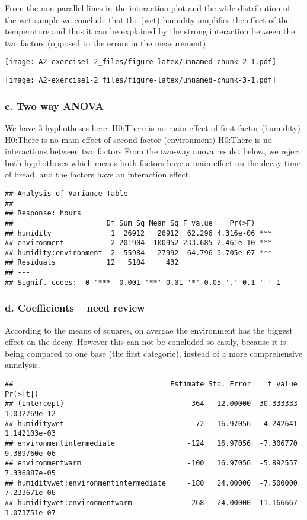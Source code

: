 \documentclass[]{article}
\begin{document}
From the non-parallel lines in the interaction plot and the wide
distribution of the wet sample we conclude that the (wet) humidity
amplifies the effect of the temperature and thus it can be explained by
the strong interaction between the two factors (opposed to the errors in
the measurement).

\texttt{[image: A2-exercise1-2\_files/figure-latex/unnamed-chunk-2-1.pdf]}

\texttt{[image: A2-exercise1-2\_files/figure-latex/unnamed-chunk-3-1.pdf]}

\hypertarget{c.-two-way-anova}{%
\subsubsection{c. Two way ANOVA}\label{c.-two-way-anova}}

We have 3 hyphotheses here: H0:There is no main effect of first factor
(humidity) H0:There is no main effect of second factor (environment)
H0:There is no interactions between two factors From the two-way anova
resulst below, we reject both hyphotheses which means both factors have
a main effect on the decay time of bread, and the factors have an
interaction effect.

\begin{verbatim}
## Analysis of Variance Table
## 
## Response: hours
##                      Df Sum Sq Mean Sq F value    Pr(>F)    
## humidity              1  26912   26912  62.296 4.316e-06 ***
## environment           2 201904  100952 233.685 2.461e-10 ***
## humidity:environment  2  55984   27992  64.796 3.705e-07 ***
## Residuals            12   5184     432                      
## ---
## Signif. codes:  0 '***' 0.001 '**' 0.01 '*' 0.05 '.' 0.1 ' ' 1
\end{verbatim}

\hypertarget{d.-coefficients-need-review}{%
\subsubsection{d. Coefficients -- need review
---}\label{d.-coefficients-need-review}}

According to the means of squares, on avergae the environment has the
biggest effect on the decay. However this can not be concluded so
easily, because it is being compared to one base (the first categorie),
instead of a more comprehensive annalysis.

\begin{verbatim}
##                                     Estimate Std. Error    t value     Pr(>|t|)
## (Intercept)                              364   12.00000  30.333333 1.032769e-12
## humiditywet                               72   16.97056   4.242641 1.142103e-03
## environmentintermediate                 -124   16.97056  -7.306770 9.389760e-06
## environmentwarm                         -100   16.97056  -5.892557 7.336887e-05
## humiditywet:environmentintermediate     -180   24.00000  -7.500000 7.233671e-06
## humiditywet:environmentwarm             -268   24.00000 -11.166667 1.073751e-07
\end{verbatim}
\end{document}
